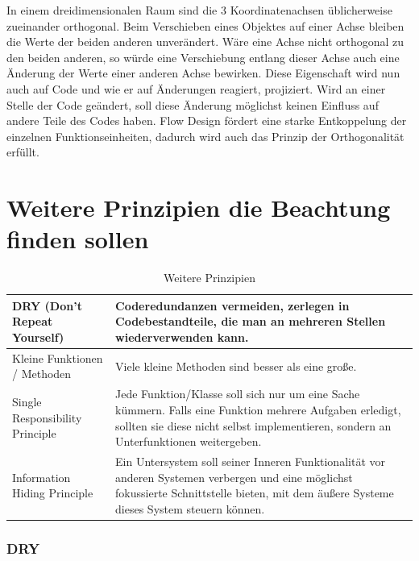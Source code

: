 In einem dreidimensionalen Raum sind die 3 Koordinatenachsen üblicherweise zueinander
orthogonal. Beim Verschieben eines Objektes auf einer Achse bleiben die Werte der
beiden anderen unverändert. Wäre eine Achse nicht orthogonal zu den beiden anderen,
so würde eine Verschiebung entlang dieser Achse auch eine Änderung der Werte
einer anderen Achse bewirken. Diese Eigenschaft wird nun auch auf Code und wie
er auf Änderungen reagiert, projiziert.
Wird an einer Stelle der Code geändert, soll diese Änderung möglichst keinen Einfluss auf
andere Teile des Codes haben. Flow Design fördert eine starke Entkoppelung der
einzelnen Funktionseinheiten, dadurch wird auch das Prinzip der
Orthogonalität erfüllt.


\section{Weitere Prinzipien die Beachtung finden sollen}

\bigskip
\begin{table}[H]
	\centering
\begin{tabularx}{\textwidth}{| p{160 pt} | X |}
	\hline
DRY  (Don't Repeat Yourself) \cite[S. 80 und S. 342]{Martin2009}  & Coderedundanzen vermeiden, zerlegen in Codebestandteile, die man an mehreren Stellen wiederverwenden kann. \\ \hline
Kleine Funktionen / Methoden {\cite[S. 64]{Martin2009}} & Viele kleine Methoden sind besser als eine große. \\ \hline
Single Responsibility Principle \cite[S. 176 f.]{Martin2009} & Jede Funktion/Klasse soll sich nur um eine Sache kümmern. Falls eine Funktion mehrere 
Aufgaben erledigt, sollten sie diese nicht selbst implementieren, sondern an Unterfunktionen weitergeben. \\ \hline
Information Hiding Principle \cite[S. 48 f.]{schummelzettel}  & Ein Untersystem soll seiner Inneren Funktionalität vor anderen Systemen verbergen und eine möglichst fokussierte Schnittstelle bieten, mit dem äußere Systeme dieses System steuern können.\\ \hline
	\end{tabularx}
	\medskip
	\caption{Weitere Prinzipien}
\end{table}

\subsubsection{DRY}
  
